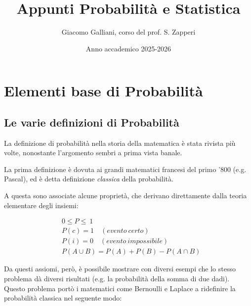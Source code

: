\documentclass{report}
\title{\Huge{\textbf{Appunti Probabilità e Statistica}}}
\author{Giacomo Galliani, corso del prof. S. Zapperi}
\date{Anno accademico 2025-2026}
\renewcommand{\contentsname}{Indice}
\begin{document}
\maketitle
\newpage%
\pdfbookmark[section]{\contentsname}{toc}
\tableofcontents
\pagebreak

\chapter{Elementi base di Probabilità}

\section{Le varie definizioni di Probabilità}
    
La definizione di probabilità nella storia della matematica è stata rivista più volte, nonostante l'argomento sembri a prima vista banale. 

La prima definizione è dovuta ai grandi matematici francesi del primo '800 (e.g. Pascal), ed è detta definizione \emph{classica} della probabilità. 


A questa sono associate alcune proprietà, che derivano direttamente dalla teoria elementare degli insiemi: 

\begin{align}
    & 0 \leq P \leq \ 1 \\
    & P(c)= 1 \quad (evento \ certo) \\
    & P(i) = 0 \quad (evento \ impossibile) \\
    & P(A \cup B ) = P(A) + P(B) - P(A \cap B) 
\end{align}

Da questi assiomi, però, è possibile mostrare con diversi esempi che lo stesso problema dà diversi risultati (e.g. la probabilità della somma di due dadi). \\

Questo problema portò i matematici come Bernoulli e Laplace a ridefinire la probabilità classica nel seguente modo: 

\end{document}
